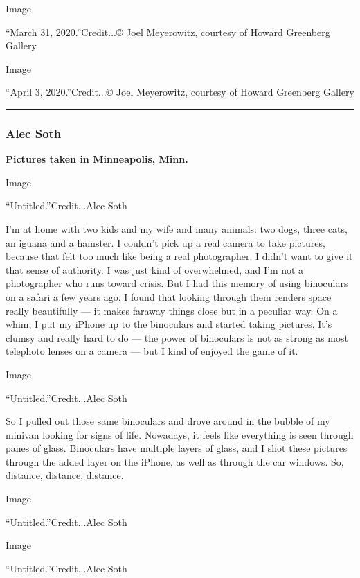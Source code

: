 Image

``March 31, 2020.''Credit...© Joel Meyerowitz, courtesy of Howard
Greenberg Gallery

Image

``April 3, 2020.''Credit...© Joel Meyerowitz, courtesy of Howard
Greenberg Gallery

\begin{center}\rule{0.5\linewidth}{\linethickness}\end{center}

\hypertarget{alec-soth}{%
\subsubsection{\texorpdfstring{\textbf{Alec
Soth}}{Alec Soth}}\label{alec-soth}}

\textbf{Pictures taken in Minneapolis, Minn.}

Image

``Untitled.''Credit...Alec Soth

I'm at home with two kids and my wife and many animals: two dogs, three
cats, an iguana and a hamster. I couldn't pick up a real camera to take
pictures, because that felt too much like being a real photographer. I
didn't want to give it that sense of authority. I was just kind of
overwhelmed, and I'm not a photographer who runs toward crisis. But I
had this memory of using binoculars on a safari a few years ago. I found
that looking through them renders space really beautifully --- it makes
faraway things close but in a peculiar way. On a whim, I put my iPhone
up to the binoculars and started taking pictures. It's clumsy and really
hard to do --- the power of binoculars is not as strong as most
telephoto lenses on a camera --- but I kind of enjoyed the game of it.

Image

``Untitled.''Credit...Alec Soth

So I pulled out those same binoculars and drove around in the bubble of
my minivan looking for signs of life. Nowadays, it feels like everything
is seen through panes of glass. Binoculars have multiple layers of
glass, and I shot these pictures through the added layer on the iPhone,
as well as through the car windows. So, distance, distance, distance.

Image

``Untitled.''Credit...Alec Soth

Image

``Untitled.''Credit...Alec Soth

